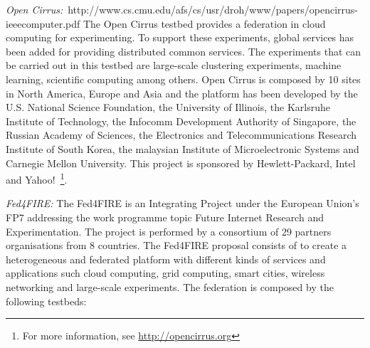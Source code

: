 \emph{Open
  Cirrus:}~{http://www.cs.cmu.edu/afs/cs/usr/droh/www/papers/opencirrus-ieeecomputer.pdf}
The Open Cirrus testbed provides a federation in cloud computing for
experimenting. To support these experiments, global services has been added for
providing distributed common services. The experiments that can be carried out
in this testbed are large-scale clustering experiments, machine learning,
scientific computing among others. Open Cirrus is composed by 10 sites in North
America, Europe and Asia and the platform has been developed by the
U.S. National Science Foundation, the University of Illinois, the Karlsruhe
Institute of Technology, the Infocomm Development Authority of Singapore, the
Russian Academy of Sciences, the Electronics and Telecommunications Research
Institute of South Korea, the malaysian Institute of Microelectronic Systems and
Carnegie Mellon University. This project is sponsored by Hewlett-Packard, Intel
and Yahoo!~\footnote{For more information, see \url{http://opencirrus.org}}.

\emph{Fed4FIRE:} The Fed4FIRE is an Integrating Project under the European
Union's \ac{FP7} addressing the work programme topic Future Internet Research
and Experimentation. The project is performed by a consortium of 29 partners
organisations from 8 countries. The Fed4FIRE  proposal consists of to create a
heterogeneous and federated platform with different kinds of services and applications such
cloud computing, grid computing, smart cities, wireless networking and
large-scale experiments. The federation is composed by the following testbeds:


